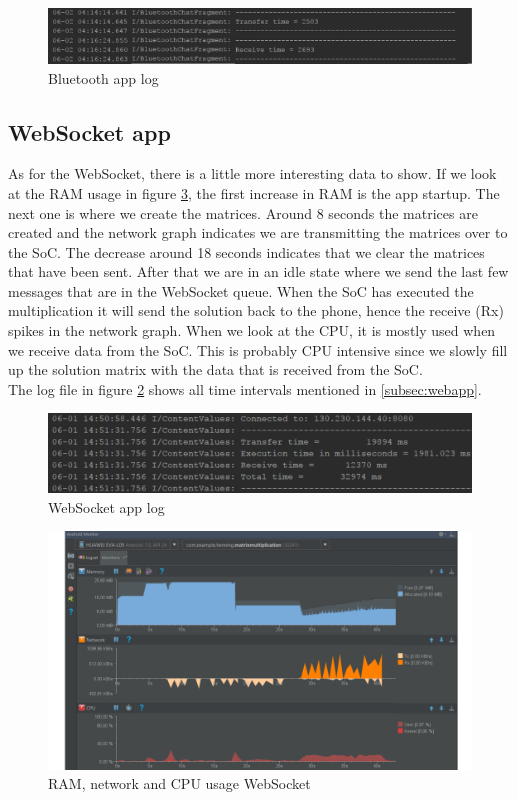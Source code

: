 \documentclass[a4paper, 11pt]{report}
\begin{document}
\begin{figure}[ht]
\centering
\includegraphics[scale=0.5]{images/app3Log.pdf}
\caption{Bluetooth app log}\label{fig:app3log}
\end{figure}

	\subsection{WebSocket app}
As for the WebSocket, there is a little more interesting data to show. If we look at the RAM usage in figure \ref{fig:app2usage}, the first increase in RAM is the app startup. The next one is where we create the matrices. Around 8 seconds the matrices are created and the network graph indicates we are transmitting the matrices over to the SoC. The decrease around 18 seconds indicates that we clear the matrices that have been sent. After that we are in an idle state where we send the last few messages that are in the WebSocket queue. When the SoC has executed the multiplication it will send the solution back to the phone, hence the receive (Rx) spikes in the network graph. When we look at the CPU, it is mostly used when we receive data from the SoC. This is probably CPU intensive since we slowly fill up the solution matrix with the data that is received from the SoC.\\
The log file in figure \ref{fig:app2log} shows all time intervals mentioned in \ref{subsec:webapp}.

\begin{figure}[hbtp]
\centering
\includegraphics[scale=0.35]{images/app2resultlog.pdf}
\caption{WebSocket app log}\label{fig:app2log}
\end{figure}

\begin{figure}[hbtp]
\centering
\includegraphics[scale=0.35]{images/app2resultgraph.pdf}
\caption{RAM, network and CPU usage WebSocket}\label{fig:app2usage}
\end{figure}
\end{document}
